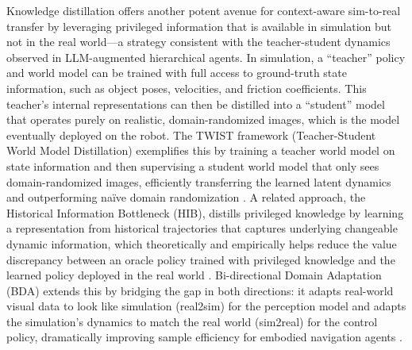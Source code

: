 \documentclass[11pt]{article}
\begin{document}
Knowledge distillation offers another potent avenue for context-aware sim-to-real transfer by leveraging privileged information that is available in simulation but not in the real world---a strategy consistent with the teacher-student dynamics observed in LLM-augmented hierarchical agents. In simulation, a ``teacher'' policy and world model can be trained with full access to ground-truth state information, such as object poses, velocities, and friction coefficients. This teacher's internal representations can then be distilled into a ``student'' model that operates purely on realistic, domain-randomized images, which is the model eventually deployed on the robot. The TWIST framework (Teacher-Student World Model Distillation) exemplifies this by training a teacher world model on state information and then supervising a student world model that only sees domain-randomized images, efficiently transferring the learned latent dynamics and outperforming naïve domain randomization \cite{ref405}. A related approach, the Historical Information Bottleneck (HIB), distills privileged knowledge by learning a representation from historical trajectories that captures underlying changeable dynamic information, which theoretically and empirically helps reduce the value discrepancy between an oracle policy trained with privileged knowledge and the learned policy deployed in the real world \cite{ref406}. Bi-directional Domain Adaptation (BDA) extends this by bridging the gap in both directions: it adapts real-world visual data to look like simulation (real2sim) for the perception model and adapts the simulation's dynamics to match the real world (sim2real) for the control policy, dramatically improving sample efficiency for embodied navigation agents \cite{ref407}.
\end{document}
